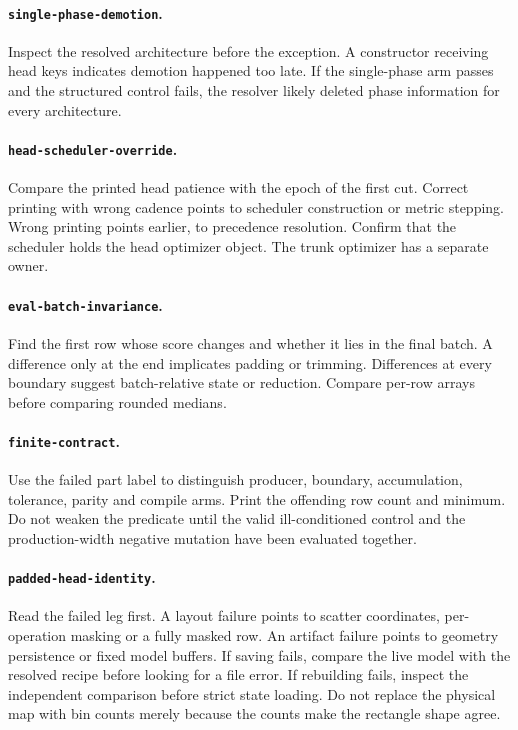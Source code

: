 \documentclass[10pt,aps,prd,twocolumn,nofootinbib]{revtex4-2}
\newcommand{\code}[1]{\texttt{#1}}
\begin{document}
\paragraph{\code{single-phase-demotion}.}
Inspect the resolved architecture before the exception.  A constructor
receiving head keys indicates demotion happened too late.  If the single-phase
arm passes and the structured control fails, the resolver likely deleted
phase information for every architecture.

\paragraph{\code{head-scheduler-override}.}
Compare the printed head patience with the epoch of the first cut.  Correct
printing with wrong cadence points to scheduler construction or metric
stepping.  Wrong printing points earlier, to precedence resolution.  Confirm
that the scheduler holds the head optimizer object.  The trunk optimizer has
a separate owner.

\paragraph{\code{eval-batch-invariance}.}
Find the first row whose score changes and whether it lies in the final batch.
A difference only at the end implicates padding or trimming.  Differences at
every boundary suggest batch-relative state or reduction.  Compare per-row
arrays before comparing rounded medians.

\paragraph{\code{finite-contract}.}
Use the failed part label to distinguish producer, boundary, accumulation,
tolerance, parity and compile arms.  Print the offending row count and
minimum.  Do not weaken the predicate until the valid ill-conditioned control
and the production-width negative mutation have been evaluated together.

\paragraph{\code{padded-head-identity}.}
Read the failed leg first.  A layout failure points to scatter coordinates,
per-operation masking or a fully masked row.  An artifact failure points to
geometry persistence or fixed model buffers.  If saving fails, compare the live
model with the resolved recipe before looking for a file error.  If rebuilding
fails, inspect the independent comparison before strict state loading.  Do not
replace the physical map with bin counts merely because the counts make the
rectangle shape agree.
\end{document}
